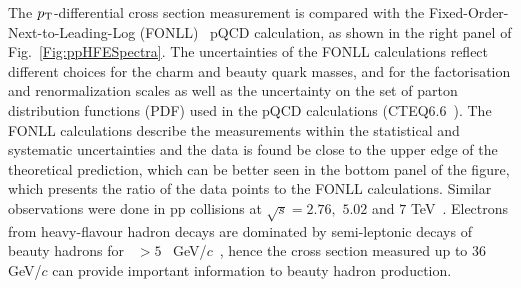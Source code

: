 The $p_{\rm{T}}$-differential cross section measurement is compared with the Fixed-Order-Next-to-Leading-Log (FONLL)~\cite{Cacciari:1998it} pQCD calculation, as shown in the right panel of Fig.~\ref{Fig:ppHFESpectra}. The uncertainties of the FONLL calculations reflect different choices for the charm and beauty quark masses, and for the factorisation and renormalization scales as well as the uncertainty on the set of parton distribution functions (PDF) used in the pQCD calculations (CTEQ6.6~\cite{Nadolsky:2008zw}). The FONLL calculations describe the measurements within the statistical and systematic uncertainties and the data is found be close to the upper edge of the theoretical prediction, which can be better seen in the bottom panel of the figure, which presents the ratio of the data points to the FONLL calculations. 
Similar observations were done in pp collisions at $\sqrt{s} = 2.76,$ $5.02$ and $7$ TeV~\cite{Abelev:2014gla, Acharya:2018upq, Acharya:2019mom, Abelev:2012xe}. Electrons from heavy-flavour hadron decays are dominated by semi-leptonic decays of beauty hadrons for \pt~$>5$ ~GeV/$c$~\cite{Abelev:2012sca, Abelev:2014hla}, hence the cross section measured up to 36 GeV/$c$ can provide important information to beauty hadron production. 

